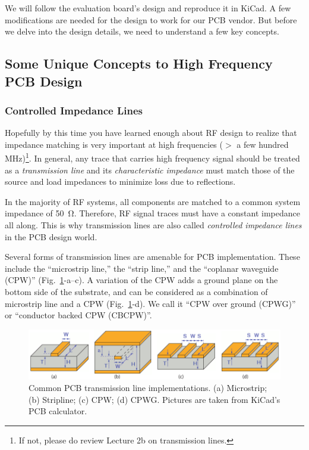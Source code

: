 \documentclass[12pt,letterpaper]{scrartcl}
\begin{document}
We will follow the evaluation board's design and reproduce it in KiCad. A few modifications are needed for the design to work for our PCB vendor. But before we delve into the design details, we need to understand a few key concepts.

\subsection{Some Unique Concepts to High Frequency PCB Design}

\subsubsection{Controlled Impedance Lines}\label{sec:tline}

Hopefully by this time you have learned enough about RF design to realize that impedance matching is very important at high frequencies ($>$ a few hundred MHz)\footnote{If not, please do review Lecture 2b on transmission lines.}. In general, any trace that carries high frequency signal should be treated as a \textit{transmission line} and its \textit{characteristic impedance} must match those of the source and load impedances to minimize loss due to reflections. 

In the majority of RF systems, all components are matched to a common system impedance of \SI{50}{\ohm}. Therefore, RF signal traces must have a constant impedance all along. This is why transmission lines are also called \textit{controlled impedance lines} in the PCB design world. 

Several forms of transmission lines are amenable for PCB implementation. These include the ``microstrip line,'' the ``strip line,'' and the ``coplanar waveguide (CPW)'' (Fig.~\ref{fig:tlines}-a--c). A variation of the CPW adds a ground plane on the bottom side of the substrate, and can be considered as a combination of microstrip line and a CPW (Fig.~\ref{fig:tlines}-d). We call it ``CPW over ground (CPWG)'' or ``conductor backed CPW (CBCPW)''. 

	\begin{figure}[h]
		\centering
		\includegraphics[width=6in]{tlines}
		\caption{Common PCB transmission line implementations. (a) Microstrip; (b) Stripline; (c) CPW; (d) CPWG. Pictures are taken from KiCad's PCB calculator.}
		\label{fig:tlines}
	\end{figure}
	
\end{document}
